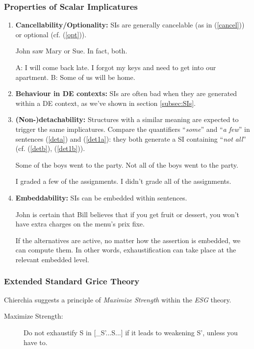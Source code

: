 \documentclass[a4paper,11pt]{article}
\newcommand{\reff}[1]{(\ref{#1})}
\newcommand{\exs}[2][]{\begin{exe}\ex #1 \begin{xlist}#2\end{xlist}\end{exe}}
\begin{document}
\subsubsection{Properties of Scalar Implicatures}
\begin{enumerate}
\item \textbf{Cancellability/Optionality:} SIs are generally cancelable (as in \reff{cancel}) or optional (cf. \reff{opt}).
\exs{
  \ex\label{cancel} John saw Mary or Sue. In fact, both.
  \ex\label{opt}
    \begin{xlist}
      \ex\label{opta} A: I will come back late. I forgot my keys and need to get into our apartment.
      \ex\label{optb} B: Some of us will be home.
    \end{xlist}
}

\item \textbf{Behaviour in DE contexts:} SIs are often bad when they are generated within a DE context, as we've shown in section \ref{subsec:SIs}.

\item \textbf{(Non-)detachability:} Structures with a similar meaning are expected to trigger the same implicatures.
Compare the quantifiers \enquote{\emph{some}} and \enquote{\emph{a few}} in sentences \reff{deta} and \reff{det1a}: they both generate a SI containing \enquote{\emph{not all}} (cf. \reff{detb}, \reff{det1b}).
\exs{
  \ex\label{deta} Some of the boys went to the party.
  \ex\label{detb} Not all of the boys went to the party.
}
\exs{
  \ex\label{det1a} I graded a few of the assignments.
  \ex\label{det1b} I didn't grade all of the assignments.
}

\item \textbf{Embeddability:} SIs can be embedded within sentences.

\begin{exe}
  \ex\label{emb1} John is certain that Bill believes that if you get fruit or dessert, you won't have extra charges on the menu's prix fixe.
\end{exe}

If the alternatives are active, no matter how the assertion is embedded, we can compute them. In other words, exhaustification can take place at the relevant embedded level. 
\end{enumerate}

\subsubsection{Extended Standard Grice Theory}
Chierchia suggests a principle of \emph{Maximize Strength} within the \emph{ESG} theory.
\begin{description}
  \item[Maximize Strength:]\label{maxstr} Do not exhaustify S in [_{S'}...S...] if it leads to weakening S', unless you have to.
\end{description}
\end{document}
